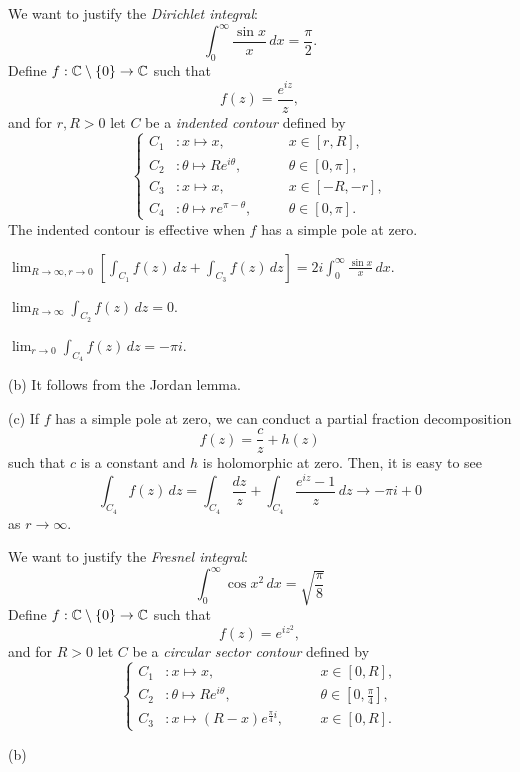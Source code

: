 \documentclass{../../large}
\begin{document}
\begin{prb}
We want to justify the \emph{Dirichlet integral}:
\[\int_0^\infty\frac{\sin x}x\,dx=\frac\pi2.\]
Define $f:\mathbb{C}\setminus\{0\}\to\mathbb{C}$ such that
\[f(z)=\frac{e^{iz}}z,\]
and for $r,R>0$ let $C$ be a \emph{indented contour} defined by
\[\left\{
\begin{alignedat}{2}
C_1&:x\mapsto x,&\quad&x\in[r,R],\\
C_2&:\theta\mapsto Re^{i\theta},&&\theta\in[0,\pi],\\
C_3&:x\mapsto x,&&x\in[-R,-r],\\
C_4&:\theta\mapsto re^{\pi-\theta},&&\theta\in[0,\pi].
\end{alignedat}
\right.\]
The indented contour is effective when $f$ has a simple pole at zero.
\begin{parts}
\item $\lim_{R\to\infty,r\to0}[\int_{C_1}f(z)\,dz+\int_{C_3}f(z)\,dz]=2i\int_0^\infty\frac{\sin x}x\,dx$.
\item $\lim_{R\to\infty}\int_{C_2}f(z)\,dz=0$.
\item $\lim_{r\to0}\int_{C_4}f(z)\,dz=-\pi i$.
\end{parts}
\end{prb}
\begin{pf}
(b)
It follows from the Jordan lemma.

(c)
If $f$ has a simple pole at zero, we can conduct a partial fraction decomposition
\[f(z)=\frac cz+h(z)\]
such that $c$ is a constant and $h$ is holomorphic at zero.
Then, it is easy to see
\[\int_{C_4}f(z)\,dz=\int_{C_4}\frac{dz}z+\int_{C_4}\frac{e^{iz}-1}z\,dz\to-\pi i+0\]
as $r\to\infty$.
\end{pf}

\begin{prb}
We want to justify the \emph{Fresnel integral}:
\[\int_0^\infty\cos x^2\,dx=\sqrt{\frac\pi8}\]
Define $f:\mathbb{C}\setminus\{0\}\to\mathbb{C}$ such that
\[f(z)=e^{iz^2},\]
and for $R>0$ let $C$ be a \emph{circular sector contour} defined by
\[\left\{
\begin{alignedat}{2}
C_1&:x\mapsto x,&\quad&x\in[0,R],\\
C_2&:\theta\mapsto Re^{i\theta},&&\theta\in[0,\tfrac\pi4],\\
C_3&:x\mapsto(R-x)e^{\frac\pi4i},&&x\in[0,R].
\end{alignedat}
\right.\]
\begin{parts}
\item
\end{parts}
\end{prb}
\begin{pf}
(b)

\end{pf}
\end{document}
